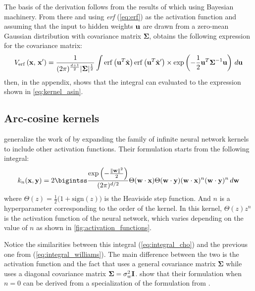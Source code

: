 The basis of the derivation follows from the results of \textcite{mackayBayesianMethodsAdaptive1999,nealBayesianTrainingBackpropagation1992} which
using Bayesian machinery. From there and using \emph{erf} (\cref{eq:erf}) as the activation function and assuming
that the input to hidden weights $\textbf u$ are drawn from a zero-mean Gaussian distribution with covariance matrix $\boldsymbol\Sigma$,
\citeauthor{williamsComputationInfiniteNeural1998}
obtains the following expression for the covariance matrix:
\begin{equation}\label{eq:integral_williams}
    V_{\operatorname{erf}}\left(\mathbf{x},\,\mathbf{x}'\right) = \frac{1}{(2\pi)^{\frac{d+1}{2}}|\boldsymbol\Sigma|^{\frac{1}{2}}}
        \int
            \operatorname{erf} \left(\textbf u^T \tilde {\mathbf{x}}\right)
            \operatorname{erf} \left(\textbf u^T \tilde {\mathbf{x}}'\right) \times \exp \left(
                -\frac{1}{2} \textbf u^T \boldsymbol\Sigma^{-1} \textbf u
            \right) \,d\textbf u
\end{equation}
then, in the appendix, \citeauthor{williamsComputationInfiniteNeural1998} shows that the integral can evaluated
to the expression shown in \cref{eq:kernel_asin}.


\subsection{Arc-cosine kernels}

\Textcite{choLargemarginClassificationInfinite2010} generalize the work of \textcite{williamsComputationInfiniteNeural1998}
by expanding the family of infinite neural network kernels to include other activation functions. Their
formulation starts from the following integral:
\begin{equation}\label{eq:integral_cho}
    k_n(\x, \y) = 2 \bigintss \frac{\exp\left(-\frac{\lVert \textbf w \rVert^2}{2}\right)}{(2\pi)^{d/2}}
        \Theta(\textbf w \cdot \x) \Theta(\textbf w \cdot \y) (\textbf w \cdot \x)^n (\textbf w \cdot \y)^n \,d\textbf w
\end{equation}
where $\Theta(z) = \frac{1}{2} \bigl(1 + \text{sign}(z)\bigr)$ is the Heaviside step function.
And $n$ is a hyperparameter corresponding to the order of the kernel.
In this kernel, $\Theta(z)z^n$ is the activation function of the neural network, which
varies depending on the value of $n$ as shown in \cref{fig:activation_functions}.

Notice the similarities between this integral (\cref{eq:integral_cho}) and the previous
one from \citeauthor{williamsComputationInfiniteNeural1998} (\cref{eq:integral_williams}).
The main difference between the two is the activation function and the fact that \citeauthor{williamsComputationInfiniteNeural1998}
uses a general covariance matrix $\boldsymbol\Sigma$ while \citeauthor{choLargemarginClassificationInfinite2010}
uses a diagonal covariance matrix $\boldsymbol\Sigma = \sigma_w^2 \textbf I$. 
show that their formulation when $n=0$ can be derived from a specialization of the formulation
from \textcite{williamsComputationInfiniteNeural1998}.

